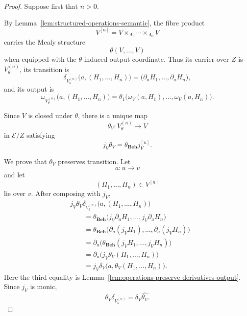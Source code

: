 \begin{proof}
    Suppose first that \(n>0\).

    By Lemma~\ref{lem:structured-operations-semantic}, the fibre product
    \[
        V^{[n]}
        =
        V\times_{A_0}\cdots\times_{A_0}V
    \]
    carries the Mealy structure
    \[
        \theta(V,\dots,V)
    \]
    when equipped with the \(\theta\)-induced output coordinate. Thus its
    carrier over \(Z\) is \(V^{(n)}_\theta\), its transition is
    \[
        \delta_{V^{(n)}_\theta}
        \bigl(
            a,(H_1,\dots,H_n)
        \bigr)
        =
        \bigl(
            \partial_aH_1,
            \dots,
            \partial_aH_n
        \bigr),
    \]
    and its output is
    \[
        \omega_{V^{(n)}_\theta}
        \bigl(
            a,(H_1,\dots,H_n)
        \bigr)
        =
        \theta_1
        \bigl(
            \omega_V(a,H_1),
            \dots,
            \omega_V(a,H_n)
        \bigr).
    \]

    Since \(V\) is closed under \(\theta\), there is a unique map
    \[
        \theta_V:
        V^{(n)}_\theta\to V
    \]
    in \(\mathcal E/Z\) satisfying
    \[
        j_V\theta_V
        =
        \theta_{\mathbf{Beh}}j_V^{[n]}.
    \]

    We prove that \(\theta_V\) preserves transition. Let
    \[
        a:u\to v
    \]
    and let
    \[
        (H_1,\dots,H_n)\in V^{[n]}
    \]
    lie over \(v\). After composing with \(j_V\),
    \[
    \begin{aligned}
        &
        j_V\theta_V
        \delta_{V^{(n)}_\theta}
        \bigl(
            a,(H_1,\dots,H_n)
        \bigr)
        \\
        &\qquad=
        \theta_{\mathbf{Beh}}
        \bigl(
            j_V\partial_aH_1,
            \dots,
            j_V\partial_aH_n
        \bigr)
        \\
        &\qquad=
        \theta_{\mathbf{Beh}}
        \bigl(
            \partial_a(j_VH_1),
            \dots,
            \partial_a(j_VH_n)
        \bigr)
        \\
        &\qquad=
        \partial_a
        \bigl(
            \theta_{\mathbf{Beh}}
            (j_VH_1,\dots,j_VH_n)
        \bigr)
        \\
        &\qquad=
        \partial_a
        \bigl(
            j_V\theta_V(H_1,\dots,H_n)
        \bigr)
        \\
        &\qquad=
        j_V\delta_V
        \bigl(
            a,
            \theta_V(H_1,\dots,H_n)
        \bigr).
    \end{aligned}
    \]
    Here the third equality is
    Lemma~\ref{lem:operations-preserve-derivatives-output}. Since \(j_V\) is
    monic,
    \[
        \theta_V\delta_{V^{(n)}_\theta}
        =
        \delta_V\widehat{\theta_V}.
    \]


\end{proof}
